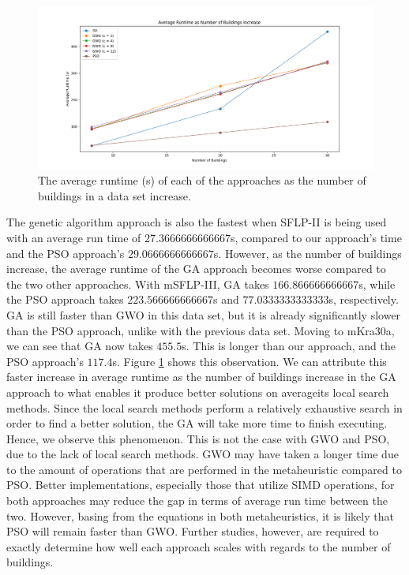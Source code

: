 \begin{figure}[h!]
\centering
\begin{adjustwidth}{-0.45in}{}
\includegraphics[scale=0.5]{./images/chap07-rd/approaches-average-runtime-over-no-of-buildings.png}
\end{adjustwidth}
\caption{The average runtime (s) of each of the approaches as the number of buildings in a data set increase.}
\label{graph-approaches-runtime-no-buildings}
\end{figure}

The genetic algorithm approach is also the fastest when SFLP-II is being used with an average run time of $27.3666666666667$s, compared to our approach's time and the PSO approach's $29.0666666666667$s. However, as the number of buildings increase, the average runtime of the GA approach becomes worse compared to the two other approaches. With mSFLP-III, GA takes $166.866666666667$s, while the PSO approach takes $223.566666666667$s and $77.0333333333333$s, respectively. GA is still faster than GWO in this data set, but it is already significantly slower than the PSO approach, unlike with the previous data set. Moving to mKra30a, we can see that GA now takes $455.5$s. This is longer than our approach, and the PSO approach's $117.4$s. Figure \ref{graph-approaches-runtime-no-buildings} shows this observation. We can attribute this faster increase in average runtime as the number of buildings increase in the GA approach to what enables it produce better solutions on average\textemdash its local search methods. Since the local search methods perform a relatively exhaustive search in order to find a better solution, the GA will take more time to finish executing. Hence, we observe this phenomenon. This is not the case with GWO and PSO, due to the lack of local search methods. GWO may have taken a longer time due to the amount of operations that are performed in the metaheuristic compared to PSO. Better implementations, especially those that utilize SIMD operations, for both approaches may reduce the gap in terms of average run time between the two. However, basing from the equations in both metaheuristics, it is likely that PSO will remain faster than GWO. Further studies, however, are required to exactly determine how well each approach scales with regards to the number of buildings.

